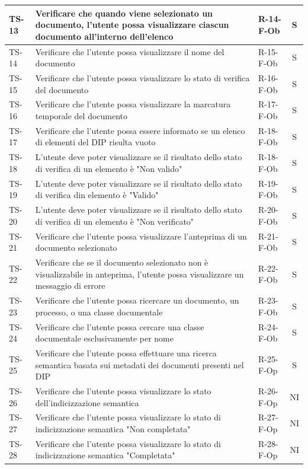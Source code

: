 \documentclass[a4paper,12pt]{article}
\begin{document}
\begin{longtable}{|p{1.5cm}|p{8.3cm}|p{2.4cm}|c|}
\hline
TS-13 & Verificare che quando viene selezionato un documento, l'utente possa visualizzare ciascun documento all'interno dell'elenco & R-14-F-Ob & S \\
\hline
TS-14 & Verificare che l'utente possa visualizzare il nome del documento & R-15-F-Ob & S \\
\hline
TS-15 & Verificare che l'utente possa visualizzare lo stato di verifica del documento & R-16-F-Ob & S \\
\hline
TS-16 & Verificare che l'utente possa visualizzare la marcatura temporale del documento & R-17-F-Ob & S \\
\hline
TS-17 & Verificare che l'utente possa essere informato se un elenco di elementi del DIP risulta vuoto & R-18-F-Ob & S \\
\hline
TS-18 & L'utente deve poter visualizzare se il risultato dello stato di verifica di un elemento è "Non valido" & R-18-F-Ob & S \\
\hline
TS-19 & L'utente deve poter visualizzare se il risultato dello stato di verifica din elemento è "Valido" & R-19-F-Ob & S \\ 
\hline
TS-20 & L'utente deve poter visualizzare se il risultato dello stato di verifica di un elemento è "Non verificato" & R-20-F-Ob & S \\
\hline
TS-21 & Verificare che l'utente possa visualizzare l'anteprima di un documento selezionato & R-21-F-Ob & S \\
\hline
TS-22 & Verificare che se il documento selezionato non è visualizzabile in anteprima, l'utente possa visualizzare un messaggio di errore & R-22-F-Ob & S \\
\hline
TS-23 & Verificare che l'utente possa ricercare un documento, un processo, o una classe documentale & R-23-F-Ob & S \\
\hline
TS-24 & Verificare che l'utente possa cercare una classe documentale esclusivamente per nome & R-24-F-Ob & S \\
\hline
TS-25 & Verificare che l'utente possa effettuare una ricerca semantica basata sui metadati dei documenti presenti nel DIP & R-25-F-Op & S \\
\hline
TS-26 & Verificare che l'utente possa visualizzare lo stato dell'indicizzazione semantica & R-26-F-Op & NI \\
\hline
TS-27 & Verificare che l'utente possa visualizzare lo stato di indicizzazione semantica "Non completata" & R-27-F-Op & NI \\
\hline
TS-28 & Verificare che l'utente possa visualizzare lo stato di indicizzazione semantica "Completata" & R-28-F-Op & NI \\

\end{longtable}
\end{document}
